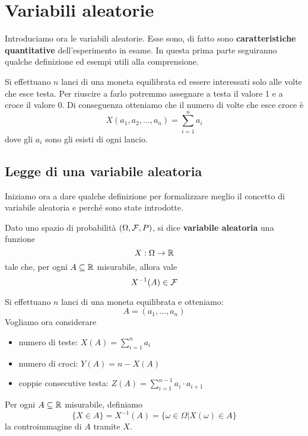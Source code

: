\chapter{Variabili aleatorie}
Introduciamo ora le variabili aleatorie. Esse sono, di fatto sono
\textbf{caratteristiche quantitative} dell'esperimento in esame. In questa prima parte seguiranno
qualche definizione ed esempi utili alla comprensione.

\begin{example}
	Si effettuano $n$ lanci di una moneta equilibrata ed essere interessati solo alle volte che
	esce testa. Per riuscire a farlo potremmo assegnare a testa il valore 1 e a croce il valore 0.
	Di conseguenza otteniamo che il numero di volte che esce croce è
	\[ X(a_1, a_2, \dots, a_n) = \sum_{i=1}^n a_i \]
	dove gli $a_i$ sono gli esisti di ogni lancio.
\end{example}

\section{Legge di una variabile aleatoria}
Iniziamo ora a dare qualche definizione per formalizzare meglio il concetto di variabile aleatoria
e perché sono state introdotte.

\begin{definition}
	Dato uno spazio di probabilità $(\Omega, \mathcal{F}, P)$, si dice \textbf{variabile aleatoria} una
	funzione
	\[ X : \Omega \to \mathbb{R} \]
	tale che, per ogni $A \subseteq \mathbb{R}$ misurabile, allora vale
	\[ X^{-1}(A) \in \mathcal{F} \]
\end{definition}

\begin{example}
	Si effettuano $n$ lanci di una moneta equilibrata e otteniamo:
	\[ A = (a_1, \dots, a_n) \]
	Vogliamo ora considerare
	\begin{itemize}
		\item numero di teste: $X(A) = \sum_{i=1}^n a_i$
		\item numero di croci: $Y(A) = n - X(A)$
		\item coppie consecutive testa: $Z(A) = \sum_{i=1}^{n-1} a_i \cdot a_{i+1}$
	\end{itemize}
\end{example}

\begin{definition}
	Per ogni $A \subseteq \mathbb{R}$ misurabile, definiamo
	\[ \{ X \in A \} = X^{-1}(A) = \{\omega \in \Omega | X(\omega) \in A \} \]
	la controimmagine di $A$ tramite $X$.
\end{definition}

